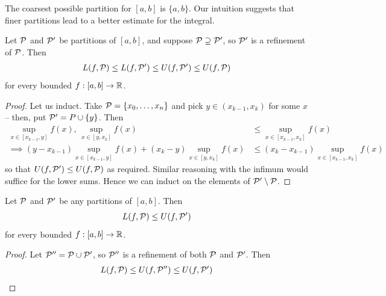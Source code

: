 \documentclass{../template/note}
\begin{document}
    
    The coarsest possible partition for \([a, b]\) is \(\{a, b\}\). Our intuition suggests that finer partitions lead to a better estimate for the integral.

    \begin{lemma}
        Let \(\mathcal{P}\) and \(\mathcal{P}'\) be partitions of \([a, b]\), and suppose \(\mathcal{P} \supseteq \mathcal{P}'\), so \(\mathcal{P}'\) is a refinement of \(\mathcal{P}\). Then 
        \begin{align*}
            L(f, \mathcal{P}) \leq L(f, \mathcal{P}') \leq U(f, \mathcal{P}') \leq U(f, \mathcal{P})
        \end{align*}
        for every bounded \(f: [a, b] \to \mathbb R\).
    \end{lemma}
    
    \begin{proof}
        Let us induct. Take \(\mathcal{P} = \{x_0, \dots, x_n\}\) and pick \(y \in (x_{k-1}, x_k)\) for some \(x\) -- then, put \(\mathcal{P}' = P \cup \{y\}\). Then
        \begin{align*}
            \sup_{x \in [x_{k-1},y]} f(x), \, \sup_{x \in [y,x_k]} f(x) &\leq \sup_{x \in [x_{k-1}, x_k]}f(x) \\ 
            \implies (y-x_{k-1})\sup_{x \in [x_{k-1},y]} f(x) + (x_k-y)\sup_{x \in [y,x_k]} f(x) &\leq (x_k-x_{k-1}) \sup_{x \in [x_{k-1}, x_k]}f(x)
        \end{align*}
        so that \(U(f, \mathcal{P}') \leq U(f, \mathcal{P})\) as required. Similar reasoning with the infimum would suffice for the lower sums. Hence we can induct on the elements of \(\mathcal{P}' \setminus \mathcal{P}\).
    \end{proof}
    
    \begin{lemma}
        Let \(\mathcal{P}\) and \(\mathcal{P}'\) be any partitions of \([a, b]\). Then
        \begin{align*}
            L(f, \mathcal{P}) \leq U(f, \mathcal{P}')
        \end{align*}
        for every bounded \(f: [a, b] \to \mathbb R\).
    \end{lemma}
    
    \begin{proof}
        Let \(\mathcal{P}'' = \mathcal{P} \cup \mathcal{P}'\), so \(\mathcal{P}''\) is a refinement of both \(\mathcal{P}\) and \(\mathcal{P}'\). Then
        \begin{align*}
            L(f, \mathcal{P}) \leq U(f, \mathcal{P}'') \leq U(f, \mathcal{P}')
        \end{align*}
    \end{proof}
    
\end{document}
